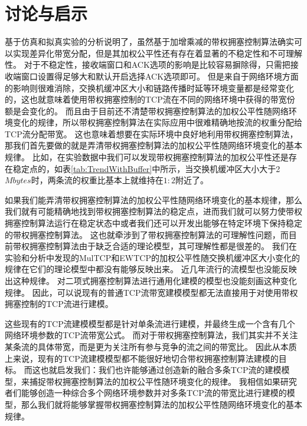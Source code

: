 \documentclass[winfonts]{njuthesis}
\begin{document}
\chapter{讨论与启示}\label{chapter:discusssion}

基于仿真和拟真实验的分析说明了，虽然基于加增乘减的带权拥塞控制算法确实可以实现差异化带宽分配，但是其加权公平性还有存在着显著的不稳定性和不可理解性。
对于不稳定性，接收端窗口和ACK选项的影响是比较容易摒除得，只需把接收端窗口设置得足够大和默认开启选择ACK选项即可。
但是来自于网络环境方面的影响则很难消除，交换机缓冲区大小和链路传播时延等环境变量都是经常变化的，这也就意味着使用带权拥塞控制的TCP流在不同的网络环境中获得的带宽份额是会变化的。
而且由于目前还不清楚带权拥塞控制算法的加权公平性随网络环境变化的规律，所以带权拥塞控制算法在实际应用中很难精确地按流的权重分配给TCP流分配带宽。
这也意味着想要在实际环境中良好地利用带权拥塞控制算法，那我们首先要做的就是弄清带权拥塞控制算法的加权公平性随网络环境变化的基本规律。
比如，在实验数据中我们可以发现带权拥塞控制算法的加权公平性还是存在稳定点的，如表\ref{tab:TrendWithBuffer}中所示，当交换机缓冲区大小大于2$Mbytes$时，两条流的权重比基本上就维持在$1:2$附近了。

如果我们能弄清带权拥塞控制算法的加权公平性随网络环境变化的基本规律，那么我们就有可能精确地找到带权拥塞控制算法的稳定点，进而我们就可以努力使带权拥塞控制算法运行在稳定状态中或者我们还可以开发出能够在特定环境下保持稳定的带权拥塞控制算法。
这也就牵涉到了带权拥塞控制算法的可理解性问题，而目前带权拥塞控制算法由于缺乏合适的理论模型，其可理解性都是很差的。
我们在实验和分析中发现的MulTCP和EWTCP的加权公平性随交换机缓冲区大小变化的规律在它们的理论模型\cite{crowcroft1998differentiated}\cite{padhye1998modeling}中都没有能够反映出来。
近几年流行的流模型\cite{alizadeh2011analysis}\cite{zhu2015congestion}也没能反映出这种规律。
对二项式拥塞控制算法进行通用化建模的模型\cite{bansal2001binomial}也没能刻画这种变化规律。
因此，可以说现有的普通TCP流带宽建模模型都无法直接用于对使用带权拥塞控制的TCP流进行建模。

这些现有的TCP流建模模型都是针对单条流进行建模，并最终生成一个含有几个网络环境参数的TCP流带宽公式。
而对于带权拥塞控制算法，我们其实并不关注某条流的具体带宽，而是更为关注所有参与竞争的流之间的带宽比。
因此从本质上来说，现有的TCP流建模模型都不能很好地切合带权拥塞控制算法建模的目标。
而这也就启发我们：我们也许能够通过创造新的融合多条TCP流的建模模型，来捕捉带权拥塞控制算法的加权公平性随环境变化的规律。
我相信如果研究者们能够创造一种综合多个网络环境参数并对多条TCP流的带宽比进行建模的模型，那么我们就将能够掌握带权拥塞控制算法的加权公平性随网络环境变化的基本规律。
\end{document}
